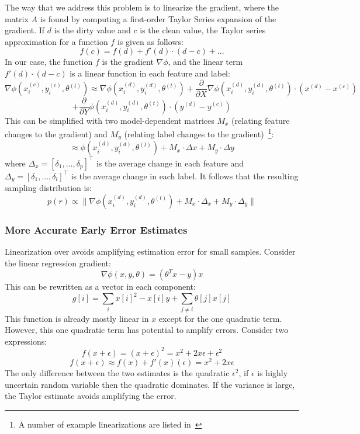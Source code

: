The way that we address this problem is to linearize the gradient, where the matrix $A$ is found by computing a first-order Taylor Series expansion of the gradient.
If $d$ is the dirty value and $c$ is the clean value, the Taylor series approximation for a function $f$ is given as follows:
\[
f(c) = f(d) + f'(d)\cdot(d-c) + ...
\]
In our case, the function $f$ is the gradient $\nabla\phi$, and the linear term $f'(d)\cdot(d-c)$ is a linear function in each feature and label:
\[
\nabla\phi(x^{(c)}_i,y^{(c)}_i,\theta^{(t)}) \approx 
\nabla\phi(x^{(d)}_i,y^{(d)}_i,\theta^{(t)}) 
+ \frac{\partial}{\partial X}\nabla\phi(x^{(d)}_i,y^{(d)}_i,\theta^{(t)})
\cdot (x^{(d)} - x^{(c)}) 
\]
\[+ \frac{\partial}{\partial Y}\phi(x^{(d)}_i,y^{(d)}_i,\theta^{(t)})\cdot (y^{(d)} - y^{(c)})
\]
This can be simplified with two model-dependent matrices $M_x$ (relating feature changes to the gradient) and $M_y$ (relating label changes to the gradient)~\footnote{A number of example linearizations are listed in~\cite{activecleanarxiv}}:
\[
\approx \phi(x^{(d)}_i,y^{(d)}_i,\theta^{(t)}) + M_x \cdot \Delta x + M_y \cdot \Delta y
\]
where $\Delta_x = [\delta_1, ..., \delta_p]^{\intercal}$ is the average change in each feature and $\Delta_y = [\delta_1, ..., \delta_l]^{\intercal}$ is the average change in each label.
It follows that the resulting sampling distribution is:
\[
p(r)\propto\|\nabla\phi(x^{(d)}_i,y^{(d)}_i,\theta^{(t)}) + M_x \cdot \Delta_{x} +  M_y \cdot \Delta_{y}\|
\]

\iffalse
\subsubsection{More Accurate Early Error Estimates}\label{acc}
Linearization over avoids amplifying estimation error for small samples.
Consider the linear regression gradient:
\[
\nabla\phi(x,y,\theta) = (\theta^Tx - y)x
\]
This can be rewritten as a vector in each component:
\[
g[i] = \sum_{i} x[i]^2-x[i]y + \sum_{j \ne i} \theta[j]x[j]
\]
This function is already mostly linear in $x$ except for the one quadratic term.
However, this one quadratic term has potential to amplify errors.
Consider two expressions:
\[
f(x+\epsilon) = (x+\epsilon)^2 = x^2 + 2x\epsilon + \epsilon^2
\]
\[
f(x+\epsilon) \approx f(x) + f'(x)(\epsilon) = x^2 + 2x\epsilon
\]
The only difference between the two estimates is the quadratic $\epsilon^2$, if $\epsilon$ is highly uncertain random variable then the quadratic dominates.
If the variance is large, the Taylor estimate avoids amplifying the error.



